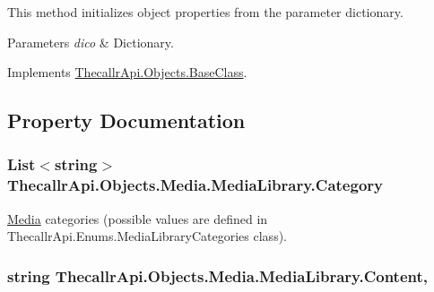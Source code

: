 This method initializes object properties from the parameter dictionary. 


\begin{DoxyParams}{Parameters}
{\em dico} & Dictionary.\\
\hline
\end{DoxyParams}


Implements \hyperlink{class_thecallr_api_1_1_objects_1_1_base_class_a77680f2cb89665fe65039581c7d907d2}{Thecallr\+Api.\+Objects.\+Base\+Class}.



\subsection{Property Documentation}
\hypertarget{class_thecallr_api_1_1_objects_1_1_media_1_1_media_library_a3f76165fd490356b94ce34cbb43cdbc3}{
\subsubsection[{Category}]{\setlength{\rightskip}{0pt plus 5cm}List$<$string$>$ Thecallr\+Api.\+Objects.\+Media.\+Media\+Library.\+Category\hspace{0.3cm}{\ttfamily [get]}}}\label{class_thecallr_api_1_1_objects_1_1_media_1_1_media_library_a3f76165fd490356b94ce34cbb43cdbc3}


\hyperlink{namespace_thecallr_api_1_1_objects_1_1_media}{Media} categories (possible values are defined in Thecallr\+Api.\+Enums.\+Media\+Library\+Categories class). 

\hypertarget{class_thecallr_api_1_1_objects_1_1_media_1_1_media_library_a6dd097f204166d9489e5bd28d67849be}{
\subsubsection[{Content}]{\setlength{\rightskip}{0pt plus 5cm}string Thecallr\+Api.\+Objects.\+Media.\+Media\+Library.\+Content\hspace{0.3cm}{\ttfamily [get]}, {\ttfamily [set]}}}\label{class_thecallr_api_1_1_objects_1_1_media_1_1_media_library_a6dd097f204166d9489e5bd28d67849be}


